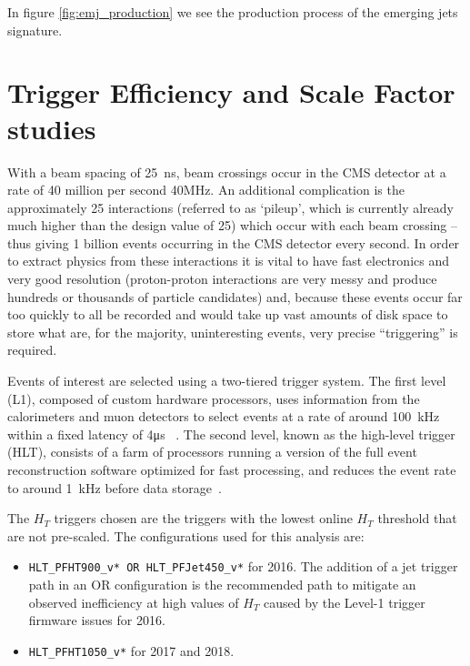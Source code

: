In figure \ref{fig:emj_production} we see the production process of the emerging jets signature.

\clearpage

\section{Trigger Efficiency and Scale Factor studies}


With a beam spacing of 25~ns, beam crossings occur in the CMS detector at a rate of 40 million per second 40\unit{\MHz}.
An additional complication is the approximately 25 interactions (referred to as `pileup', which is currently already much higher than the design value of 25) which occur with each beam crossing -- thus giving 1 billion events occurring in the CMS detector every second. In order to extract physics from these interactions it is vital to have fast electronics and very good resolution (proton-proton interactions are very messy and produce hundreds or thousands of particle candidates) and, because these events occur far too quickly to all be recorded and would take up vast amounts of disk space to store what are, for the majority, uninteresting events, very precise ``triggering'' is required.

Events of interest are selected using a two-tiered trigger system. The first level (L1), composed of custom hardware processors, uses information from the calorimeters and muon detectors to select events at a rate of around 100~\unit{kHz} within a fixed latency of 4\unit{\us} ~\cite{CMS:2020cmk}. The second level, known as the high-level trigger (HLT), consists of a farm of processors running a version of the full event reconstruction software optimized for fast processing, and reduces the event rate to around 1~\unit{kHz} before data storage~\cite{CMS:2016ngn}.


The $H_T$ triggers chosen are the triggers with the lowest online $H_T$ threshold that are not pre-scaled. The configurations used for this analysis are:

\begin{itemize}
	\item \verb|HLT_PFHT900_v* OR HLT_PFJet450_v*| for 2016. The addition of a jet trigger path in an OR configuration is the recommended path to mitigate an observed inefficiency at high values of $H_T$ caused by the Level-1 trigger firmware issues for 2016.
	\item \verb|HLT_PFHT1050_v*| for 2017 and 2018.
\end{itemize}

